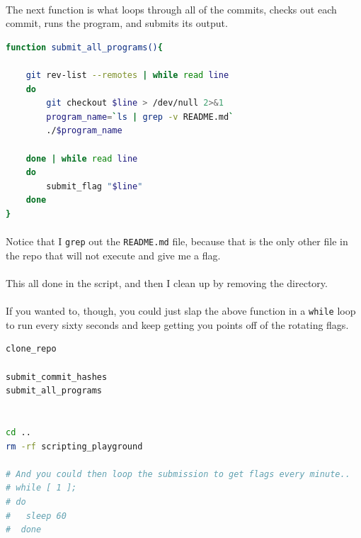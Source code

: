 \documentclass[11pt]{article}
\begin{document}
	\newpage

	\paragraph{} The next function is what loops through all of the commits, checks out each commit, runs the program, and submits its output.

	\begin{lstlisting}[language=Bash]
function submit_all_programs(){

	git rev-list --remotes | while read line
	do
		git checkout $line > /dev/null 2>&1
		program_name=`ls | grep -v README.md`
		./$program_name

	done | while read line
	do
		submit_flag "$line"
	done
}
\end{lstlisting}

	\paragraph{} Notice that I \texttt{grep} out the \texttt{README.md} file, because that is the only other file in the repo that will not execute and give me a flag. 

	\paragraph{} This all done in the script, and then I clean up by removing the directory. 

	\paragraph{} If you wanted to, though, you could just slap the above function in a \texttt{while} loop to run every sixty seconds and keep getting you points off of the rotating flags.

		\begin{lstlisting}[language=Bash]
clone_repo

submit_commit_hashes
submit_all_programs


cd ..
rm -rf scripting_playground

# And you could then loop the submission to get flags every minute..
# while [ 1 ];
# do
# 	sleep 60
#  done
\end{lstlisting}

	\paragraph{} \paragraph{} \paragraph{}
\end{document}
